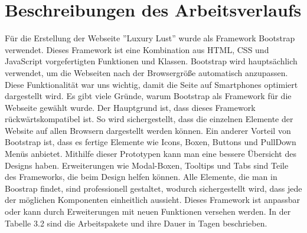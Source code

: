 \section{Beschreibungen des Arbeitsverlaufs}
Für die Erstellung der Webseite ''Luxury Lust'' wurde als Framework Bootstrap verwendet. Dieses Framework ist eine Kombination aus HTML, CSS und JavaScript vorgefertigten Funktionen und Klassen. Bootstrap wird haupts\"achlich verwendet, um die Webseiten nach der Browsergr\"oße automatisch anzupassen. Diese Funktionalität war uns wichtig, damit die Seite auf Smartphones optimiert dargestellt wird.
Es gibt viele Gr\"unde, warum Bootstrap als Framework für die Webseite gew\"ahlt wurde. Der Hauptgrund ist, dass dieses Framework r\"uckw\"artskompatibel ist. So wird sichergestellt, dass die einzelnen Elemente der Website auf allen Browsern dargestellt werden k\"onnen. Ein anderer Vorteil von Bootstrap ist, dass es fertige Elemente wie Icons, Boxen, Buttons und PullDown Men\"us anbietet. Mithilfe dieser Prototypen kann man eine bessere \"Ubersicht des Designs haben. Erweiterungen wie Modal-Boxen, Tooltips und Tabs sind Teile des Frameworks, die beim Design helfen k\"onnen. Alle Elemente, die man in Boostrap findet, sind professionell gestaltet, wodurch sichergestellt wird, dass jede der m\"oglichen Komponenten einheitlich aussieht.
Dieses Framework ist anpassbar oder kann durch Erweiterungen mit neuen Funktionen versehen werden.
\newline
In der Tabelle 3.2 sind die Arbeitspakete und ihre Dauer in Tagen beschrieben.
\newline
\newline
\newline
\newline
\newline
\newline

